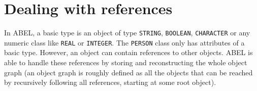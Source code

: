 \documentclass[a4paper,12pt]{report}
\begin{document}
% 
% 
% 

\chapter{Dealing with references}
\label {chapter:references}

In ABEL, a basic type is an object of type \lstinline!STRING!, \lstinline!BOOLEAN!, \lstinline!CHARACTER! or any numeric class like \lstinline!REAL! or \lstinline!INTEGER!.
The \lstinline!PERSON! class only has attributes of a basic type. 
However, an object can contain references to other objects. ABEL is able to handle these references by storing and reconstructing the whole object graph 
(an object graph is roughly defined as all the objects that can be reached by recursively following all references, starting at some root object).
\end{document}
